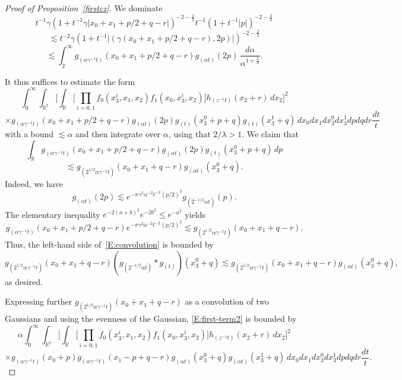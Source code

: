 \documentclass[12pt,reqno]{amsart}
\theoremstyle{plain}
\theoremstyle{definition}
\numberwithin{equation}{section}
\newcommand{\R}{{\mathbb R}}
\begin{document}
\begin{proof}[Proof of Proposition~\ref{firstcz}]
We dominate
\begin{equation*}
t^{-1} \gamma (1+t^{-1}\gamma|x_0+x_1+p/2+q-r|)^{-2-\frac{2}{\lambda}}
t^{-1}(1+t^{-1}|p|)^{-2-\frac{2}{\lambda}}
\end{equation*}
\begin{equation*}
\lesssim t^{-2}\gamma (1+t^{-1}|(\gamma(x_0+x_1+p/2+q-r), 2p)|)^{-2-\frac{2}{\lambda}}
\end{equation*}
\begin{equation*}
\lesssim \int_2^\infty g_{(\alpha \gamma^{-1}t)}(x_0+x_1+p/2+q-r) g_{(\alpha t)}(2p) \,\frac{d\alpha}{\alpha^{1+\frac{2}{\lambda}}}.
\end{equation*} 


It thus suffices to estimate the form
\begin{equation}
\label{E:first-term2}
\int_{0}^\infty \int_{\R^7} 
\Big[
\int_{\R} 
\Big[  \prod_{i=0,1} f_0(x_3^i,x_1,x_2) f_1(x_0,x_3^i,x_2) \Big] h_{(z^{-1}t)}(x_2+r) \,dx_2 \Big]^2 
\end{equation}
\begin{equation*}
\times g_{(\alpha \gamma^{-1}t)}(x_0+x_1+p/2+q-r) g_{(\alpha t)}(2p)
g_{(t)}(x_3^0+p+q)
g_{(t)}(x_3^1+q) \,
dx_0 dx_1 dx_3^0 dx_3^1 dp dq dr\frac{dt}{t}
\end{equation*}
with a bound $\lesssim \alpha$ and then integrate over $\alpha$, using that $2/\lambda>1$.
We claim that
\begin{equation}\label{E:convolution}
\int_{\R} g_{(\alpha \gamma^{-1}t)}(x_0+x_1+p/2+q-r) g_{(\alpha t)}(2p)
g_{(t)}(x_3^0+p+q) \,dp
\end{equation}
\begin{equation*}
\lesssim g_{(2^{1/2}\alpha \gamma^{-1}t)}(x_0+x_1+q-r) g_{(\alpha t)}(x_3^0+q). 
\end{equation*}
Indeed, we have
\[
g_{(\alpha t)}(2p)
\lesssim e^{-\pi \gamma^2 \alpha^{-2} t^{-2} (p/2)^2} g_{(2^{-1/2}\alpha t)}(p).
\]
The elementary inequality $e^{-2(a+b)^2} e^{-2b^2} \leq e^{-a^2}$ yields
\[
g_{(\alpha \gamma^{-1}t)}(x_0+x_1+p/2+q-r) e^{-\pi \gamma^2 \alpha^{-2} t^{-2} (p/2)^2}
\lesssim g_{(2^{1/2}\alpha \gamma^{-1}t)}(x_0+x_1+q-r).
\]
Thus, the left-hand side of~\eqref{E:convolution} is bounded by
\[
g_{(2^{1/2}\alpha \gamma^{-1}t)}(x_0+x_1+q-r) (g_{(2^{-1/2}\alpha t)} \ast g_{(t)})(x_3^0+q)
\lesssim g_{(2^{1/2}\alpha \gamma^{-1}t)}(x_0+x_1+q-r) g_{(\alpha t)}(x_3^0+q),
\]
as desired. 
 

Expressing further $g_{(2^{1/2}\alpha \gamma^{-1}t)}(x_0+x_1+q-r)$ as a convolution of two Gaussians and using the evenness of the Gaussian, \eqref{E:first-term2} is bounded by
\begin{equation}\label{E:first-term4}
\alpha \int_{0}^\infty \int_{\R^7} 
\Big[
\int_{\R} 
\Big[  \prod_{i=0,1} f_0(x_3^i,x_1,x_2) f_1(x_0,x_3^i,x_2) \Big] h_{(z^{-1}t)}(x_2+r) \,dx_2 \Big]^2  
\end{equation}
\begin{equation*}
\times g_{(\alpha \gamma^{-1}t)}(x_0+p) g_{(\alpha \gamma^{-1}t)}(x_1-p+q-r)  
g_{(\alpha t)}(x_3^0+q)
g_{(\alpha t)}(x_3^1+q) \,
dx_0 dx_1 dx_3^0 dx_3^1 dp dq dr \frac{dt}{t}.
\end{equation*}


\end{proof}
\end{document}
